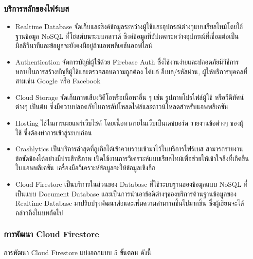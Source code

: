 \subsubsection{บริการหลักของไฟร์เบส} 

\begin{itemize}
	\item Realtime Database จัดเก็บและซิงค์ข้อมูลระหว่างผู้ใช้และอุปกรณ์ต่างๆแบบเรียลไทม์โดยใช้ฐานข้อมูล NoSQL ที่โฮสต์บนระบบคลาวด์ ซิงค์ข้อมูลที่อัปเดตระหว่างอุปกรณ์ที่เชื่อมต่อเป็นมิลลิวินาทีและข้อมูลจะยังคงมีอยู่ถ้าแอพพลิเคชันออฟไลน์
	\item Authentication จัดการบัญชีผู้ใช้ด้วย Firebase Auth ซึ่งใช้งานง่ายและปลอดภัยมีวิธีการหลายในการสร้างบัญชีผู้ใช้และตรวจสอบความถูกต้อง ได้แก่ อีเมล/รหัสผ่าน, ผู้ให้บริการบุคคลที่สามเช่น Google หรือ Facebook 
	\item Cloud Storage จัดเก็บภาพเสียงวิดีโอหรือเนื้อหาอื่น ๆ เช่น รูปภาพโปรไฟล์ผู้ใช้ หรือวีดีทัศน์ต่างๆ เป็นต้น ซึ่งมีความปลอดภัยในการอัปโหลดไฟล์และดาวน์โหลดสำหรับแอพพลิเคชัน
	\item Hosting ใช้ในการเผยแพร่เว็บไซต์  โดยเนื้อหาภายในเว็บเป็นเดชบอร์ด รายงานข้อต่างๆ ของผู้ใช้ ซึ่งต้องทำการเข้าสู่ระบบก่อน
	\item Crashlytics เป็นบริการล่าสุดที่กูเกิลได้เข้าควบรวมเข้ามาไว้ในบริการไฟร์เบส สามารถรายงานข้อขัดข้องได้อย่างมีประสิทธิภาพ เปิดใช้งานการวิเคราะห์แบบเรียลไทม์เพื่อช่วยให้เข้าใจสิ่งที่เกิดขึ้นในแอพพลิเคชัน เครื่องมือวิเคราะห์ข้อมูลจะให้ข้อมูลเชิงลึก
	\item Cloud Firestore เป็นบริการในส่วนของ Database ที่ใช้ระบบฐานของข้อมูลแบบ NoSQL ที่เป็นแบบ Document Database และเป็นการนำเอาข้อดีต่างๆของบริการด้านฐานข้อมูลของ Realtime Database มาปรับปรุงพัฒนาต่อและเพิ่มความสามารถขึ้นไปมากขึ้น ซึ่งผู้เขียนจะได้กล่าวถึงในบทถัดไป
\end{itemize}

\subsubsection{การพัฒนา Cloud Firestore} 
การพัฒนา Cloud Firestore แบ่งออกแบบ 5 ขั้นตอน ดังนี้

